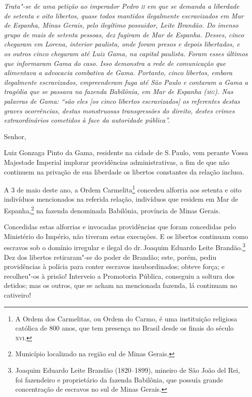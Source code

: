 \begin{flushleft}
{\footnotesize\itshape
Trata"-se de uma petição ao imperador Pedro \textsc{ii} em que se demanda a
liberdade de setenta e oito libertos, quase todos mantidos
ilegalmente escravizados em Mar de Espanha, Minas Gerais, pelo ilegítimo
possuidor, Leite Brandão. Do imenso grupo de mais de setenta pessoas,
dez fugiram de Mar de Espanha. Desses, cinco chegaram em Lorena,
interior paulista, onde foram presos e depois libertados, e os
outros cinco chegaram até Luiz Gama, na capital paulista. Foram esses
últimos que informaram Gama do caso. Isso demonstra a rede de comunicação que alimentava a
advocacia combativa de Gama. Portanto, cinco libertos, embora
ilegalmente escravizados, empreenderam fuga até São Paulo e contaram a
Gama a tragédia que se passava na fazenda Babilônia, em Mar de Espanha
(\textsc{mg}). Nas palavras de Gama: ``são eles {[}os cinco libertos
escravizados{]} os referentes destas graves ocorrências, destas
monstruosas transgressões do direito, destes crimes extraordinários
cometidos à face da autoridade pública''. }
\end{flushleft}

Senhor,

Luiz Gonzaga Pinto da Gama, residente na cidade de S.\,Paulo, vem perante
Vossa Majestade Imperial implorar providências administrativas, a fim de
que não continuem na privação de sua liberdade os libertos constantes da
relação inclusa.

A 3 de maio deste ano, a Ordem Carmelita\footnote{A Ordem dos
  Carmelitas, ou Ordem do Carmo, é uma instituição religiosa católica de
  800 anos, que tem presença no Brasil desde os finais do século \textsc{xvi}.}
concedeu alforria aos setenta e oito indivíduos mencionados na referida
relação, indivíduos que residem em Mar de Espanha,\footnote{Município
  localizado na região sul de Minas Gerais.} na fazenda denominada
Babilônia, província de Minas Gerais.

Concedidas estas alforrias e invocadas providências que foram concedidas
pelo Ministério do Império, não tiveram estas execuções. E os libertos
continuam como escravos sob o domínio irregular e ilegal do dr.\,Joaquim
Eduardo Leite Brandão.\footnote{Joaquim Eduardo Leite Brandão
  (1820--1899), mineiro de São João del Rei, foi fazendeiro e
  proprietário da fazenda Babilônia, que possuía grande concentração de
  escravos no sul de Minas Gerais.} Dez dos libertos retiraram"-se do
poder de Brandão; este, porém, pediu providências à polícia para conter
escravos insubordinados; obteve força; e recolheu"-os à prisão! Interveio
a Promotoria Pública, conseguiu a soltura dos detidos; mas os outros,
que se acham na mencionada fazenda, lá continuam no cativeiro!


